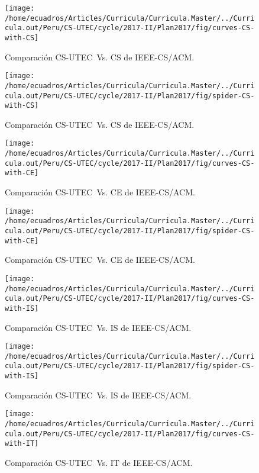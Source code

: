 \documentclass[a4paper,10pt]{book}
\begin{document}
\begin{figure}
\centering
	\texttt{[image: /home/ecuadros/Articles/Curricula/Curricula.Master/../Curricula.out/Peru/CS-UTEC/cycle/2017-II/Plan2017/fig/curves-CS-with-CS]}
	\caption{Comparaci\'on CS-UTEC~Vs. CS de IEEE-CS/ACM.}
	\label{fig:comparing-curves-CS-UTEC-with-CS}
\end{figure}

\begin{figure}
\centering
	\texttt{[image: /home/ecuadros/Articles/Curricula/Curricula.Master/../Curricula.out/Peru/CS-UTEC/cycle/2017-II/Plan2017/fig/spider-CS-with-CS]}
	\caption{Comparaci\'on CS-UTEC~Vs. CS de IEEE-CS/ACM.}
	\label{fig:comparing-spider-CS-UTEC-with-CS}
\end{figure}

\begin{figure}
\centering
	\texttt{[image: /home/ecuadros/Articles/Curricula/Curricula.Master/../Curricula.out/Peru/CS-UTEC/cycle/2017-II/Plan2017/fig/curves-CS-with-CE]}
	\caption{Comparaci\'on CS-UTEC~Vs. CE de IEEE-CS/ACM.}
	\label{fig:comparing-curves-CS-UTEC-with-CE}
\end{figure}

\begin{figure}
\centering
	\texttt{[image: /home/ecuadros/Articles/Curricula/Curricula.Master/../Curricula.out/Peru/CS-UTEC/cycle/2017-II/Plan2017/fig/spider-CS-with-CE]}
	\caption{Comparaci\'on CS-UTEC~Vs. CE de IEEE-CS/ACM.}
	\label{fig:comparing-spider-CS-UTEC-with-CE}
\end{figure}

\begin{figure}
\centering
	\texttt{[image: /home/ecuadros/Articles/Curricula/Curricula.Master/../Curricula.out/Peru/CS-UTEC/cycle/2017-II/Plan2017/fig/curves-CS-with-IS]}
	\caption{Comparaci\'on CS-UTEC~Vs. IS de IEEE-CS/ACM.}
	\label{fig:comparing-curves-CS-UTEC-with-IS}
\end{figure}

\begin{figure}
\centering
	\texttt{[image: /home/ecuadros/Articles/Curricula/Curricula.Master/../Curricula.out/Peru/CS-UTEC/cycle/2017-II/Plan2017/fig/spider-CS-with-IS]}
	\caption{Comparaci\'on CS-UTEC~Vs. IS de IEEE-CS/ACM.}
	\label{fig:comparing-spider-CS-UTEC-with-IS}
\end{figure}

\begin{figure}
\centering
	\texttt{[image: /home/ecuadros/Articles/Curricula/Curricula.Master/../Curricula.out/Peru/CS-UTEC/cycle/2017-II/Plan2017/fig/curves-CS-with-IT]}
	\caption{Comparaci\'on CS-UTEC~Vs. IT de IEEE-CS/ACM.}
	\label{fig:comparing-curves-CS-UTEC-with-IT}
\end{figure}
\end{document}
